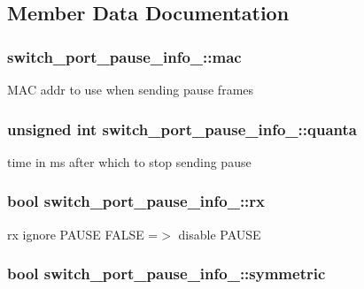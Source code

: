 \subsection{Member Data Documentation}
\hypertarget{structswitch__port__pause__info___affba5a33b49d1fe90c039eb455a0cdb8}{
\subsubsection[{mac}]{ switch\+\_\+port\+\_\+pause\+\_\+info\+\_\+\+::mac}}\label{structswitch__port__pause__info___affba5a33b49d1fe90c039eb455a0cdb8}
M\+A\+C addr to use when sending pause frames \hypertarget{structswitch__port__pause__info___a5537bf1e9ba77d29d7f1a3cd9bb97f7e}{
\subsubsection[{quanta}]{\setlength{\rightskip}{0pt plus 5cm}unsigned int switch\+\_\+port\+\_\+pause\+\_\+info\+\_\+\+::quanta}}\label{structswitch__port__pause__info___a5537bf1e9ba77d29d7f1a3cd9bb97f7e}
time in ms after which to stop sending pause \hypertarget{structswitch__port__pause__info___a920238ca28555086724ea12235ec0f3e}{
\subsubsection[{rx}]{\setlength{\rightskip}{0pt plus 5cm}bool switch\+\_\+port\+\_\+pause\+\_\+info\+\_\+\+::rx}}\label{structswitch__port__pause__info___a920238ca28555086724ea12235ec0f3e}
rx ignore P\+A\+U\+S\+E F\+A\+L\+S\+E =$>$ disable P\+A\+U\+S\+E \hypertarget{structswitch__port__pause__info___acfc8be4a685c9ffbf3acb06948c167e6}{
\subsubsection[{symmetric}]{\setlength{\rightskip}{0pt plus 5cm}bool switch\+\_\+port\+\_\+pause\+\_\+info\+\_\+\+::symmetric}}\label{structswitch__port__pause__info___acfc8be4a685c9ffbf3acb06948c167e6}
